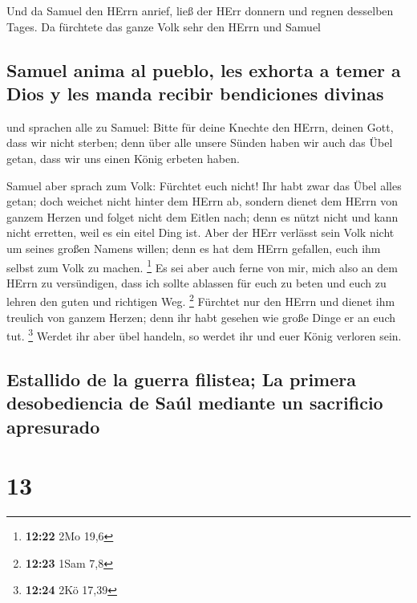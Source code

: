  Und da Samuel den HErrn anrief, ließ der HErr donnern
und regnen desselben Tages. Da fürchtete das ganze Volk sehr den HErrn
und Samuel

\hypertarget{samuel-anima-al-pueblo-les-exhorta-a-temer-a-dios-y-les-manda-recibir-bendiciones-divinas}{%
\subsection{Samuel anima al pueblo, les exhorta a temer a Dios y les
manda recibir bendiciones
divinas}\label{samuel-anima-al-pueblo-les-exhorta-a-temer-a-dios-y-les-manda-recibir-bendiciones-divinas}}

 und sprachen alle zu Samuel: Bitte für deine Knechte den
HErrn, deinen Gott, dass wir nicht sterben; denn über alle unsere Sünden
haben wir auch das Übel getan, dass wir uns einen König erbeten haben.

 Samuel aber sprach zum Volk: Fürchtet euch nicht! Ihr
habt zwar das Übel alles getan; doch weichet nicht hinter dem HErrn ab,
sondern dienet dem HErrn von ganzem Herzen  und folget
nicht dem Eitlen nach; denn es nützt nicht und kann nicht erretten, weil
es ein eitel Ding ist.  Aber der HErr verlässt sein Volk
nicht um seines großen Namens willen; denn es hat dem HErrn gefallen,
euch ihm selbst zum Volk zu machen. \footnote{\textbf{12:22} 2Mo 19,6}
 Es sei aber auch ferne von mir, mich also an dem HErrn
zu versündigen, dass ich sollte ablassen für euch zu beten und euch zu
lehren den guten und richtigen Weg. \footnote{\textbf{12:23} 1Sam 7,8}
 Fürchtet nur den HErrn und dienet ihm treulich von
ganzem Herzen; denn ihr habt gesehen wie große Dinge er an euch tut.
\footnote{\textbf{12:24} 2Kö 17,39}  Werdet ihr aber übel
handeln, so werdet ihr und euer König verloren sein.

\hypertarget{estallido-de-la-guerra-filistea-la-primera-desobediencia-de-sauxfal-mediante-un-sacrificio-apresurado}{%
\subsection{Estallido de la guerra filistea; La primera desobediencia de
Saúl mediante un sacrificio
apresurado}\label{estallido-de-la-guerra-filistea-la-primera-desobediencia-de-sauxfal-mediante-un-sacrificio-apresurado}}

\hypertarget{section-12}{%
\section{13}\label{section-12}}

